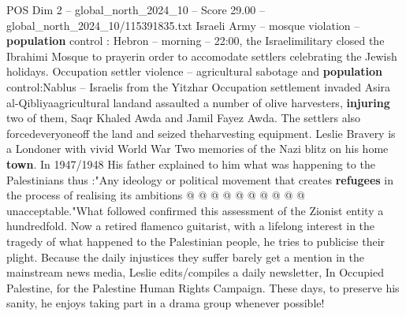 \begin{textsample}{POS Dim 2 – global\_north\_2024\_10 – Score 29.00 – global\_north\_2024\_10/115391835.txt}
Israeli Army -- mosque violation -- \textbf{population} control : Hebron -- morning -- 22:00, the Israelimilitary closed the Ibrahimi Mosque to prayerin order to accomodate settlers celebrating the Jewish holidays.
Occupation settler violence -- agricultural sabotage and \textbf{population} control:Nablus -- Israelis from the Yitzhar Occupation settlement invaded Asira al-Qibliyaagricultural landand assaulted a number of olive harvesters, \textbf{injuring} two of them, Saqr Khaled Awda and Jamil Fayez Awda.
The settlers also forcedeveryoneoff the land and seized theharvesting equipment.
Leslie Bravery is a Londoner with vivid World War Two memories of the Nazi blitz on his home \textbf{town}.
In 1947/1948 His father explained to him what was happening to the Palestinians thus :"Any ideology or political movement that creates \textbf{refugees} in the process of realising its ambitions @ @ @ @ @ @ @ @ @ @ unacceptable."What followed confirmed this assessment of the Zionist entity a hundredfold.
Now a retired flamenco guitarist, with a lifelong interest in the tragedy of what happened to the Palestinian people, he tries to publicise their plight.
Because the daily injustices they suffer barely get a mention in the mainstream news media, Leslie edits/compiles a daily newsletter, In Occupied Palestine, for the Palestine Human Rights Campaign.
These days, to preserve his sanity, he enjoys taking part in a drama group whenever possible!

\end{textsample}
